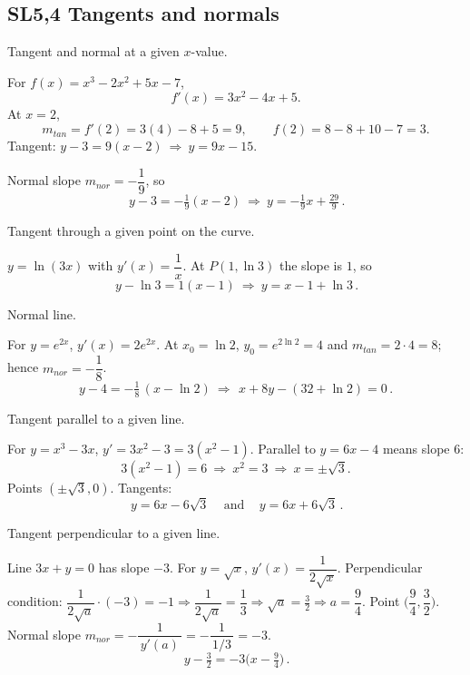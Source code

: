 \documentclass[11pt]{article}
\def\textbf#1{#1}%
\def\mathrm#1{#1}%
\newcommand{\tocsubsection}[1]{\subsection{#1}}
\begin{document}




\tocsubsection{SL5,4 Tangents and normals}


\begin{solution}
\textbf{Tangent and normal at a given $x$-value.}

For $f(x)=x^3-2x^2+5x-7$,
\[
f'(x)=3x^2-4x+5.
\]
At $x=2$,
\[
m_{\mathrm{tan}}=f'(2)=3(4)-8+5=9,\qquad
f(2)=8-8+10-7=3.
\]
Tangent: $y-3=9(x-2)\ \Rightarrow\ \boxed{y=9x-15}$.

Normal slope $m_{\mathrm{nor}}=-\dfrac1{9}$, so
\[
\boxed{\,y-3=-\tfrac{1}{9}(x-2)\ \Rightarrow\ y=-\tfrac{1}{9}x+\tfrac{29}{9}\,}.
\]
\end{solution}

\begin{solution}
\textbf{Tangent through a given point on the curve.}

$y=\ln(3x)$ with $y'(x)=\dfrac{1}{x}$.  
At $P(1,\ln3)$ the slope is $1$, so
\[
\boxed{\,y-\ln 3=1(x-1)\ \Rightarrow\ y=x-1+\ln 3\,}.
\]
\end{solution}

\begin{solution}
\textbf{Normal line.}

For $y=e^{2x}$, $y'(x)=2e^{2x}$.  
At $x_0=\ln 2$, $y_0=e^{2\ln 2}=4$ and $m_{\mathrm{tan}}=2\cdot 4=8$; hence $m_{\mathrm{nor}}=-\dfrac{1}{8}$.
\[
y-4=-\tfrac18\,(x-\ln2)\ \Longrightarrow\ \boxed{\,x+8y-(32+\ln 2)=0\,}.
\]
\end{solution}

\begin{solution}
\textbf{Tangent parallel to a given line.}

For $y=x^3-3x$, $y'=3x^2-3=3(x^2-1)$.  
Parallel to $y=6x-4$ means slope $6$:
\[
3(x^2-1)=6\ \Rightarrow\ x^2=3\ \Rightarrow\ x=\pm\sqrt{3}.
\]
Points $(\pm\sqrt{3},0)$. Tangents:
\[
\boxed{\,y=6x-6\sqrt{3}\,}\quad\text{and}\quad \boxed{\,y=6x+6\sqrt{3}\,}.
\]
\end{solution}

\begin{solution}
\textbf{Tangent perpendicular to a given line.}

Line $3x+y=0$ has slope $-3$.  
For $y=\sqrt{x}$, $y'(x)=\dfrac{1}{2\sqrt{x}}$.  
Perpendicular condition: $\dfrac{1}{2\sqrt{a}}\cdot(-3)=-1 \Rightarrow \dfrac{1}{2\sqrt{a}}=\dfrac{1}{3}\Rightarrow \sqrt{a}=\tfrac32\Rightarrow a=\dfrac{9}{4}$.
Point $\Big(\dfrac{9}{4},\dfrac{3}{2}\Big)$.  
Normal slope $m_{\mathrm{nor}}=-\dfrac{1}{\,y'(a)\,}=-\dfrac{1}{\,1/3\,}=-3$.
\[
\boxed{\,y-\tfrac{3}{2}=-3\Big(x-\tfrac{9}{4}\Big)\,}.
\]
\end{solution}
\end{document}
